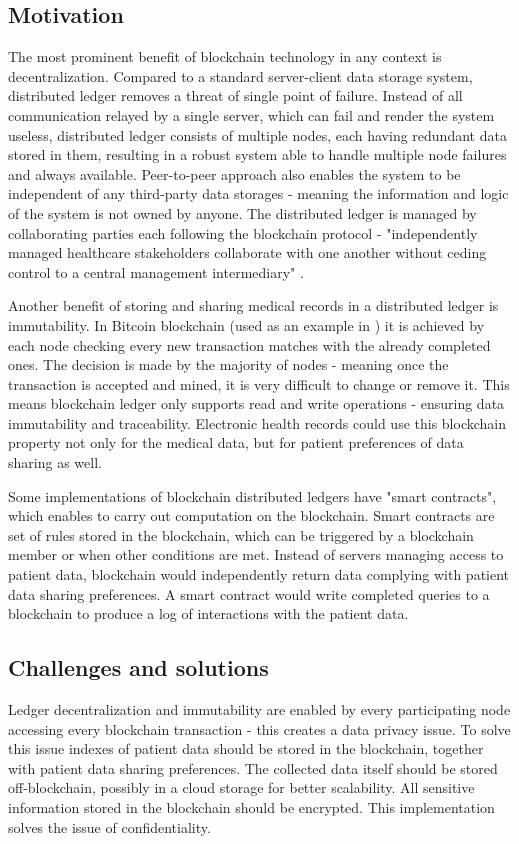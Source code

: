\documentclass[12pt]{article}
\begin{document}
        \subsection{Motivation}
        The most prominent benefit of blockchain technology in any context is decentralization. Compared to a standard server-client data storage system, distributed ledger removes a threat of single point of failure. Instead of all communication relayed by a single server, which can fail and render the system useless, distributed ledger consists of multiple nodes, each having redundant data stored in them, resulting in a robust system able to handle multiple node failures and always available. Peer-to-peer approach also enables the system to be independent of any third-party data storages - meaning the information and logic of the system is not owned by anyone. The distributed ledger is managed by collaborating parties each following the blockchain protocol - "independently managed healthcare stakeholders collaborate with one another without ceding control to a central management intermediary" \cite{dlt}.

        Another benefit of storing and sharing medical records in a distributed ledger is immutability. In Bitcoin \cite{bitcoin} blockchain (used as an example in \cite{dlt}) it is achieved by each node checking every new transaction matches with the already completed ones. The decision is made by the majority of nodes - meaning once the transaction is accepted and mined, it is very difficult to change or remove it. This means blockchain ledger only supports read and write operations - ensuring data immutability and traceability. Electronic health records could use this blockchain property not only for the medical data, but for patient preferences of data sharing as well.

        Some implementations of blockchain distributed ledgers have "smart contracts", which enables to carry out computation on the blockchain. Smart contracts are set of rules stored in the blockchain, which can be triggered by a blockchain member or when other conditions are met. Instead of servers managing access to patient data, blockchain would independently return data complying with patient data sharing preferences. A smart contract would write completed queries to a blockchain to produce a log of interactions with the patient data.

        \subsection{Challenges and solutions}
        Ledger decentralization and immutability are enabled by every participating node accessing every blockchain transaction - this creates a data privacy issue. To solve this issue indexes of patient data should be stored in the blockchain, together with patient data sharing preferences. The collected data itself should be stored off-blockchain, possibly in a cloud storage for better scalability. All sensitive information stored in the blockchain should be encrypted. This implementation solves the issue of confidentiality.
\end{document}
